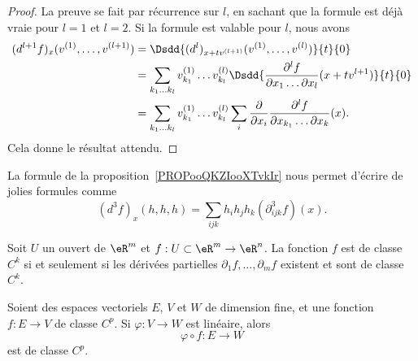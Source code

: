 \begin{proof}
    La preuve se fait par récurrence sur \( l\), en sachant que la formule est déjà vraie pour \( l=1\) et \( l=2\). Si la formule est valable pour \( l\), nous avons
    \begin{subequations}
        \begin{align}
            (d^{l+1}f)_x(v^{(1)},\ldots, v^{(l+1)})&=\Dsdd{ (d^l)_{x+tv^{(l+1)}}(v^{(1)},\ldots, v^{(l)}) }{t}{0}\\
            &=\sum_{k_1\ldots k_l}v_{k_1}^{(1)}\ldots v_{k_l}^{(l)}\Dsdd{   \frac{ \partial^lf }{ \partial x_1\ldots \partial x_l }(x+tv^{l+1})   }{t}{0}\\
            &=\sum_{k_1\ldots k_l}v_{k_1}^{(1)}\ldots v_{k_l}^{(l)}\sum_i\frac{ \partial  }{ \partial x_i }\frac{ \partial^lf }{ \partial x_{k_1}\ldots \partial x_k }(x).
        \end{align}
    \end{subequations}
    Cela donne le résultat attendu.
\end{proof}

\begin{normaltext}
    La formule de la proposition~\ref{PROPooQKZIooXTvkIr} nous permet d'écrire de jolies formules comme
    \begin{equation}        \label{EQooXRWWooMoKoOB}
        (d^3f)_x(h,h,h)=\sum_{ijk}h_ih_jh_k(\partial^3_{ijk}f)(x).
    \end{equation}
\end{normaltext}

\begin{proposition} \label{PropDYKooHvrfGw}
    Soit $U$ un ouvert de $\eR^m$ et  $f:U\subset\eR^m\to \eR^n$. La fonction $f$ est de classe $C^k$ si et seulement si les dérivées partielles $\partial_1 f, \ldots, \partial_m f $ existent et sont de classe $C^{k}$.
\end{proposition}

\begin{proposition}
    Soient des espaces vectoriels \( E\),  \( V\) et \( W\) de dimension fine, et une fonction \( f\colon E\to V\) de classe \( C^p\). Si \( \varphi\colon V\to W\) est linéaire, alors
    \begin{equation}
        \varphi\circ f\colon E\to W
    \end{equation}
    est de classe \( C^p\).
\end{proposition}


